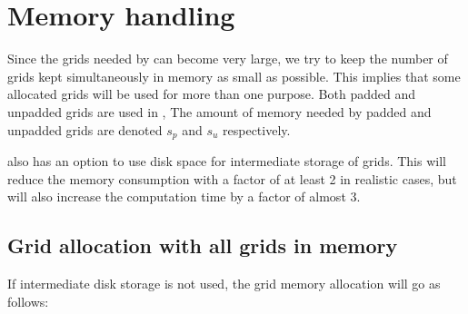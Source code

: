 \section{Memory handling}
Since the grids needed by \crava can become very large, we try to
keep the number of grids kept simultaneously in memory as small as
possible. This implies that some allocated grids will be used for more
than one purpose. Both padded and unpadded grids are used in \crava,
The amount of memory needed by padded and unpadded grids are
denoted $s_p$ and $s_u$ respectively.

\crava also has an option to use disk space for intermediate storage
of grids. This will reduce the memory consumption with a factor of at
least 2 in realistic cases, but will also increase the computation
time by a factor of almost 3.

\subsection{Grid allocation with all grids in memory}
If intermediate disk storage is not used, the grid memory allocation
will go as follows:

